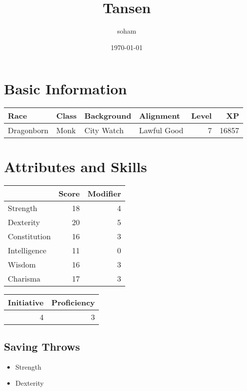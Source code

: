 \documentclass[11pt]{article}
\author{soham}
\date{\today}
\title{Tansen}
\begin{document}
\maketitle
\tableofcontents



\section{Basic Information}
\label{sec:org5eab7a6}
\begin{center}
\label{tab:org346034a}
\begin{tabular}{llllrr}
Race & Class & Background & Alignment & Level & XP\\
\hline
Dragonborn & Monk & City Watch & Lawful Good & 7 & 16857\\
\end{tabular}
\end{center}

\section{Attributes and Skills}
\label{sec:orgb7e45ed}
\begin{center}
\label{tab:org65f0037}
\begin{tabular}{lrr}
 & Score & Modifier\\
\hline
Strength & 18 & 4\\
Dexterity & 20 & 5\\
Constitution & 16 & 3\\
Intelligence & 11 & 0\\
Wisdom & 16 & 3\\
Charisma & 17 & 3\\
\end{tabular}
\end{center}

\begin{center}
\label{tab:org0eb89d4}
\begin{tabular}{rr}
Initiative & Proficiency\\
\hline
4 & 3\\
\end{tabular}
\end{center}
\subsection{Saving Throws}
\label{sec:org3862276}
\begin{itemize}
\item Strength
\item Dexterity
\end{itemize}
\end{document}

